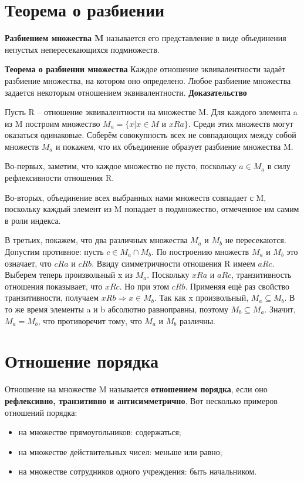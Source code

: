 \documentclass[a4paper]{article}
\begin{document}
{\begin{small}
\section*{Теорема о разбиении}
\textbf{Разбиением множества M} называется его представление в виде объединения непустых непересекающихся подмножеств.

\textbf{Теорема о разбиении множества} 
Каждое отношение эквивалентности
задаёт разбиение множества, на котором оно определено. Любое разбиение множества задается некоторым отношением эквивалентности.
\textbf{Доказательство}

Пусть R –
отношение эквивалентности на множестве M. Для каждого элемента a из M построим множество $M_a = \{x | x \in M$ и $x R a\}$. Среди этих множеств могут
оказаться одинаковые. Соберём совокупность всех не совпадающих между
собой множеств $M_a$ и покажем, что их объединение образует разбиение множества M. 

Во-первых, заметим, что каждое множество не пусто, поскольку $a \in M_a$ в
силу рефлексивности отношения R.

Во-вторых, объединение всех выбранных нами множеств совпадает с M,
поскольку каждый элемент из M попадает в подмножество, отмеченное им
самим в роли индекса.

В третьих, покажем, что два различных множества $M_a$ и $M_b$ не пересекаются.
Допустим противное: пусть $c \in M_a \cap M_b$. По построению множеств $M_a$ и $M_b$ это
означает, что $c R a$ и $c R b$. Ввиду симметричности отношения R имеем $a R c$.
Выберем теперь произвольный x из $M_a$. Поскольку $x R a$ и $a R c$, транзитивность
отношения показывает, что $x R c$. Но при этом $c R b$. Применяя ещё раз свойство
транзитивности, получаем $x R b \Rightarrow x \in M_b$. Так как x произвольный, $M_a \subseteq M_b$. В то же время элементы a и b абсолютно
равноправны, поэтому $M_b \subseteq M_a$. Значит, $M_a = M_b$, что противоречит тому, что $M_a$ и $M_b$ различны.

\section*{Отношение порядка}
Отношение на множестве M называется \textbf{отношением
порядка}, если оно \textbf{рефлексивно, транзитивно и антисимметрично}.
Вот несколько примеров отношений порядка:
\begin{itemize}
\item на множестве прямоугольников: содержаться;
\item на множестве действительных чисел: меньше или равно;
\item на множестве сотрудников одного учреждения: быть начальником.
\end{itemize}


\end{small}}
\end{document}
